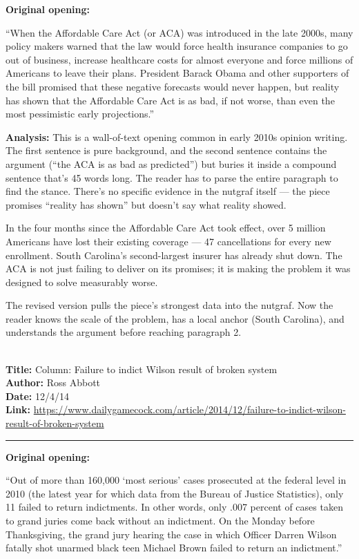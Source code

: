 \documentclass[12pt]{article}
\newcounter{examplenum}
\newcommand{\totalexamples}{10}
\newcommand{\exampleheader}[4]{%
    \newpage
    \stepcounter{examplenum}%
    \noindent{\large\bfseries\color{garnet} Example \theexamplenum\ of \totalexamples}\\[6pt]
    \textbf{Title:} #1\\
    \textbf{Author:} #2\\
    \textbf{Date:} #3\\
    \textbf{Link:} \url{#4}\\[4pt]
    \noindent\rule{\textwidth}{0.4pt}
    \vspace{6pt}
}
\begin{document}
\begin{promptbox}
\textbf{Original opening:}

``When the Affordable Care Act (or ACA) was introduced in the late 2000s, many policy makers warned that the law would force health insurance companies to go out of business, increase healthcare costs for almost everyone and force millions of Americans to leave their plans. President Barack Obama and other supporters of the bill promised that these negative forecasts would never happen, but reality has shown that the Affordable Care Act is as bad, if not worse, than even the most pessimistic early projections.''
\end{promptbox}

\textbf{Analysis:} This is a wall-of-text opening common in early 2010s opinion writing. The first sentence is pure background, and the second sentence contains the argument (``the ACA is as bad as predicted'') but buries it inside a compound sentence that's 45 words long. The reader has to parse the entire paragraph to find the stance. There's no specific evidence in the nutgraf itself --- the piece promises ``reality has shown'' but doesn't say what reality showed.

\begin{seasonbox}
In the four months since the Affordable Care Act took effect, over 5 million Americans have lost their existing coverage --- 47 cancellations for every new enrollment. South Carolina's second-largest insurer has already shut down. The ACA is not just failing to deliver on its promises; it is making the problem it was designed to solve measurably worse.
\end{seasonbox}

The revised version pulls the piece's strongest data into the nutgraf. Now the reader knows the scale of the problem, has a local anchor (South Carolina), and understands the argument before reaching paragraph 2.

\exampleheader{Column: Failure to indict Wilson result of broken system}{Ross Abbott}{12/4/14}{https://www.dailygamecock.com/article/2014/12/failure-to-indict-wilson-result-of-broken-system}

\begin{promptbox}
\textbf{Original opening:}

``Out of more than 160,000 `most serious' cases prosecuted at the federal level in 2010 (the latest year for which data from the Bureau of Justice Statistics), only 11 failed to return indictments. In other words, only .007 percent of cases taken to grand juries come back without an indictment. On the Monday before Thanksgiving, the grand jury hearing the case in which Officer Darren Wilson fatally shot unarmed black teen Michael Brown failed to return an indictment.''
\end{promptbox}
\end{document}
